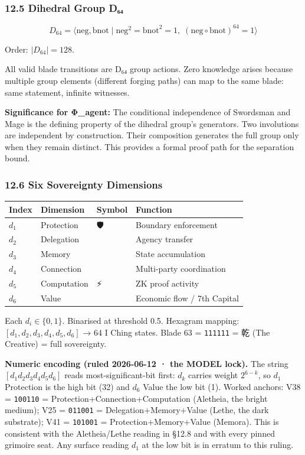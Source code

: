 \documentclass[
  11pt,
]{article}
\newcounter{none} %
\begin{document}
\subsubsection{12.5 Dihedral Group
D₆₄}\label{dihedral-group-dux2086ux2084}

\[D_{64} = \langle \text{neg}, \text{bnot} \mid \text{neg}^2 = \text{bnot}^2 = 1,\; (\text{neg} \circ \text{bnot})^{64} = 1 \rangle\]

Order: \(|D_{64}| = 128\).

All valid blade transitions are D₆₄ group actions. Zero knowledge arises
because multiple group elements (different forging paths) can map to the
same blade: same statement, infinite witnesses.

\textbf{Significance for Φ\_agent:} The conditional independence of
Swordsman and Mage is the defining property of the dihedral group's
generators. Two involutions are independent by construction. Their
composition generates the full group only when they remain distinct.
This provides a formal proof path for the separation bound.

\subsubsection{12.6 Six Sovereignty
Dimensions}\label{six-sovereignty-dimensions}

{\def\LTcaptype{none} %
\begin{longtable}[]{@{}llll@{}}
\toprule\noalign{}
Index & Dimension & Symbol & Function \\
\midrule\noalign{}
\endhead
\bottomrule\noalign{}
\endlastfoot
\(d_1\) & Protection & 🛡️ & Boundary enforcement \\
\(d_2\) & Delegation & 🤝 & Agency transfer \\
\(d_3\) & Memory & 📜 & State accumulation \\
\(d_4\) & Connection & 🔗 & Multi-party coordination \\
\(d_5\) & Computation & ⚡ & ZK proof activity \\
\(d_6\) & Value & 💎 & Economic flow / 7th Capital \\
\end{longtable}
}

Each \(d_i \in \{0, 1\}\). Binarised at threshold 0.5. Hexagram mapping:
\([d_1, d_2, d_3, d_4, d_5, d_6]\) → 64 I Ching states. Blade 63 =
\texttt{111111} = 乾 (The Creative) = full sovereignty.

\textbf{Numeric encoding (ruled 2026-06-12 · the MODEL lock).} The
string \([d_1 d_2 d_3 d_4 d_5 d_6]\) reads most-significant-bit first:
\(d_k\) carries weight \(2^{6-k}\), so \(d_1\) Protection is the high
bit (32) and \(d_6\) Value the low bit (1). Worked anchors: V38 =
\texttt{100110} = Protection+Connection+Computation (Aletheia, the
bright medium); V25 = \texttt{011001} = Delegation+Memory+Value (Lethe,
the dark substrate); V41 = \texttt{101001} = Protection+Memory+Value
(Memora). This is consistent with the Aletheia/Lethe reading in §12.8
and with every pinned grimoire seat. Any surface reading \(d_1\) at the
low bit is in erratum to this ruling.
\end{document}
